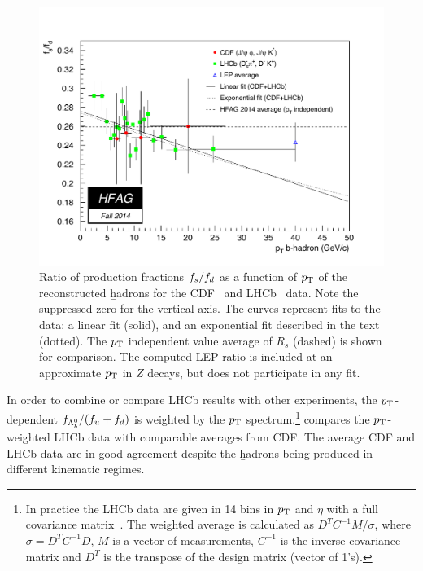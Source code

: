 \begin{figure}
 \begin{center}
  \includegraphics[width=\textwidth]{figures/life_mix/rs_comb}
  \caption{Ratio of production fractions $f_{s}/f_{d}$ as 
   a function of $p_{\rm T}$ of the reconstructed \b hadrons for the 
   CDF~\cite{CDFnote10795:2012} and LHCb~\cite{Aaij:2013qqa}
   data. Note the suppressed zero for the vertical axis.
   The curves represent fits to the data:
   a linear fit (solid), and an exponential fit described in the text (dotted).
   The $p_{\rm T}$ independent value average of $R_s$ (dashed) is shown for 
   comparison.
   The computed LEP ratio is included at an 
   approximate $p_{\rm T}$ in $Z$ decays, but does not participate in any fit.}
 \end{center}
\end{figure}

In order to combine or compare LHCb results with other experiments,
the $p_{\rm T}$-dependent $f_{\Lambda_b^0}/(f_{u} + f_{d})$ is weighted by the $p_{\rm T}$ spectrum.\footnote{
  \label{foot:life_mix:Aaij:2011jp}
  In practice the LHCb data are given in 14 bins in $p_{\rm T}$ and $\eta$ with a full covariance matrix~\cite{Aaij:2011jp}. 
  The weighted average is calculated as
  $D^T C^{-1} M/\sigma$, where $\sigma = D^T C^{-1} D$, $M$ is a vector 
  of measurements, $C^{-1}$ is the inverse covariance matrix and $D^T$ is the 
  transpose of the design matrix (vector of 1's).}
 compares 
the $p_{\rm T}$-weighted LHCb data with comparable averages from CDF. 
The average CDF 
and LHCb data are in good agreement despite the \b hadrons being produced 
in different kinematic regimes.

